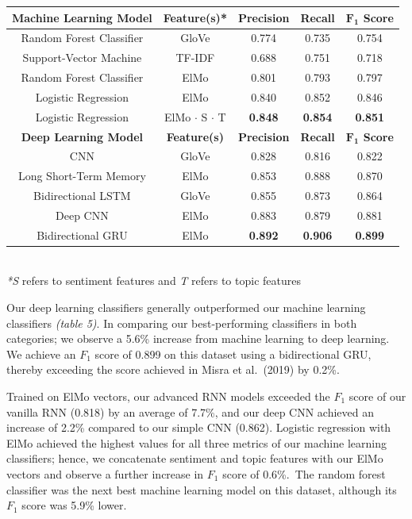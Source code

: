 \documentclass[12pt,a4paper]{article}
\begin{document}
\begin{center}
	\begin{tabular}{c||c|c|c|c}
		\hline
		\textbf{Machine Learning Model}& \textbf{Feature(s)*} & \textbf{Precision} & \textbf{Recall} & \textbf{$\mathbf{F_1}$ Score}\\
		\hline\hline
		Random Forest Classifier & GloVe  & 0.774   & 0.735 & 0.754\\
		Support-Vector Machine & TF-IDF  & 0.688   & 0.751 & 0.718\\
		Random Forest Classifier & ElMo  & 0.801   & 0.793 & 0.797\\
		Logistic Regression & ElMo  & 0.840   & 0.852 & 0.846\\
		Logistic Regression & ElMo $\cdot$ S $\cdot$ T & \textbf{0.848}   & \textbf{0.854} & \textbf{0.851}\\
		\hline\hline
		\textbf{Deep Learning Model}& \textbf{Feature(s)} & \textbf{Precision} & \textbf{Recall} & \textbf{$\mathbf{F_1}$ Score}\\
		\hline
		CNN & GloVe  & 0.828 & 0.816 & 0.822\\
		Long Short-Term Memory & ElMo  & 0.853   & 0.888 & 0.870\\
		Bidirectional LSTM & GloVe  & 0.855   & 0.873 & 0.864\\
		Deep CNN & ElMo & 0.883   & 0.879 & 0.881\\
		Bidirectional GRU & ElMo  & \textbf{0.892}   & \textbf{0.906} & \textbf{0.899}\\
		\hline
	\end{tabular}\\\vspace{5pt}
	\textit{*S} refers to sentiment features and \textit{T} refers to topic features\\\vspace{-8pt}
\end{center}

\noindent Our deep learning classifiers generally outperformed our machine learning classifiers \textit{(table 5)}. In comparing our best-performing classifiers in both categories; we observe a 5.6\% increase from machine learning to deep learning. We achieve an $F_1$ score of 0.899 on this dataset using a bidirectional GRU, thereby exceeding the score achieved in Misra et al.\ (2019) by \cite{misra2019sarcasm} 0.2\%.

Trained on ElMo vectors, our advanced RNN models exceeded the $F_1$ score of our vanilla RNN (0.818) by an average of 7.7\%, and our deep CNN achieved an increase of 2.2\% compared to our simple CNN (0.862). Logistic regression with ElMo achieved the highest values for all three metrics of our machine learning classifiers; hence, we concatenate sentiment and topic features with our ElMo vectors and observe a further increase in $F_1$ score of 0.6\%.\ The random forest classifier was the next best machine learning model on this dataset, although its $F_1$ score was 5.9\% lower.
\end{document}
